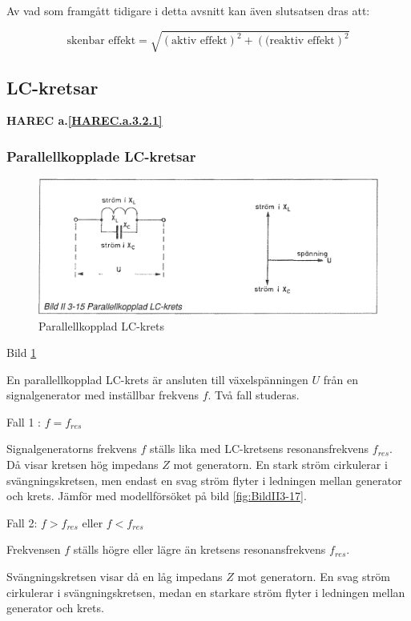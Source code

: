 Av vad som framgått tidigare i detta avsnitt kan även slutsatsen dras att:

\[
\text{skenbar effekt} = \sqrt{(\text{aktiv effekt})^2 + (\text{(reaktiv effekt})^2}
\]

\subsection{LC-kretsar}
\textbf{HAREC a.\ref{HAREC.a.3.2.1}\label{myHAREC.a.3.2.1}}

\subsubsection{Parallellkopplade LC-kretsar}

\begin{figure}
\includegraphics[width=\textwidth]{images/bild_2_3-15}
\caption{Parallellkopplad LC-krets}
\label{fig:BildII3-15}
\end{figure}

Bild \ref{fig:BildII3-15}

En parallellkopplad LC-krets är ansluten till växelspänningen \(U\) från en
signalgenerator med inställbar frekvens \(f\). Två fall studeras.

Fall 1 : \(f = f_{res}\)

Signalgeneratorns frekvens \(f\) ställs lika med LC-kretsens resonansfrekvens
\(f_{res}\). Då visar kretsen hög impedans \(Z\) mot generatorn. En stark ström
cirkulerar i svängningskretsen, men endast en svag ström flyter i ledningen
mellan generator och krets. Jämför med modellförsöket på bild \ref{fig:BildII3-17}.

Fall 2: \(f > f_{res}\) eller \(f < f_{res}\)

Frekvensen \(f\) ställs högre eller lägre än kretsens resonansfrekvens
\(f_{res}\).

Svängningskretsen visar då en låg impedans \(Z\) mot generatorn. En svag ström
cirkulerar i svängningskretsen, medan en starkare ström flyter i ledningen
mellan generator och krets.

